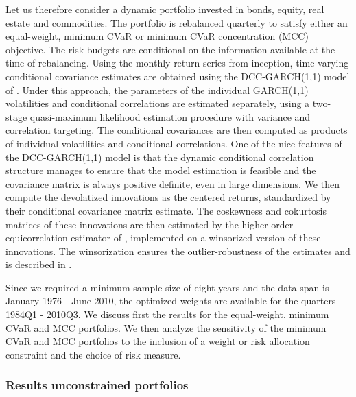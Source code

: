 \documentclass[12pt,a4paper]{article}
\begin{document}
Let us therefore consider a dynamic portfolio invested in bonds, equity, real estate and commodities. The portfolio is rebalanced quarterly to satisfy either an equal-weight, minimum CVaR or minimum CVaR concentration (MCC) objective. The risk budgets are conditional on the information available at the time of rebalancing. Using the monthly return series from inception, time-varying conditional covariance estimates are obtained using the DCC-GARCH(1,1) model of \citet{EngleDCC02}. Under this approach, the parameters of the individual GARCH(1,1) volatilities and conditional correlations are estimated separately, using a two-stage quasi-maximum likelihood estimation procedure with variance and correlation targeting. The conditional covariances are then computed as products of individual volatilities and conditional correlations. One of the nice features of the DCC-GARCH(1,1) model is that the dynamic  conditional correlation structure manages to ensure that the model
estimation is feasible and the covariance matrix is always positive definite, even in large dimensions.
  We then compute the devolatized innovations as the centered returns, standardized by their conditional covariance matrix estimate.  The coskewness and cokurtosis matrices of these innovations are then estimated by the higher order equicorrelation estimator of \citet{MartelliniZiemann2010}, implemented on a winsorized version of these innovations. The winsorization ensures the outlier-robustness of the estimates and is described in \citet{Boudt2007}.

Since we required a minimum sample size of eight years and the data span is January 1976 - June 2010, the optimized weights are available for the quarters 1984Q1 - 2010Q3.
We discuss first the results for the equal-weight, minimum CVaR and MCC portfolios. We then analyze the sensitivity of the minimum CVaR and MCC portfolios to the inclusion of a weight or risk allocation constraint and the choice of risk measure.


\subsubsection{Results unconstrained portfolios}
\end{document}
